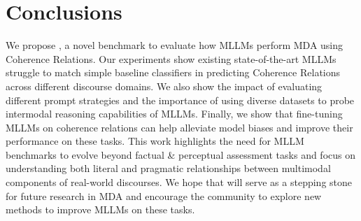 \section{Conclusions}

We propose {\name}, a novel benchmark to evaluate how MLLMs perform MDA using Coherence Relations. Our experiments show existing state-of-the-art MLLMs struggle to match simple baseline classifiers in predicting Coherence Relations across different discourse domains. We also show the impact of evaluating different prompt strategies and the importance of using diverse datasets to probe intermodal reasoning capabilities of MLLMs. Finally, we show that fine-tuning MLLMs on coherence relations can help alleviate model biases and improve their performance on these tasks. This work highlights the need for MLLM benchmarks to evolve beyond factual \& perceptual assessment tasks and focus on understanding both literal and pragmatic relationships between multimodal components of real-world discourses. We hope that {\name} will serve as a stepping stone for future research in MDA and encourage the community to explore new methods to improve MLLMs on these tasks.
